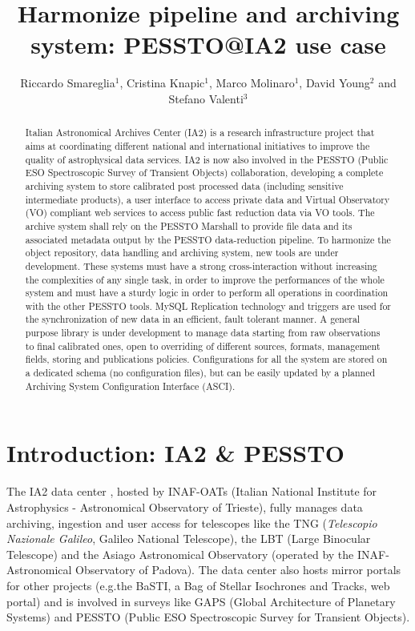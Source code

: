 \documentclass[11pt,twoside]{article}
\begin{document}
\title{Harmonize pipeline and archiving system: PESSTO@IA2 use case}
\author{Riccardo Smareglia$^1$, Cristina Knapic$^1$, Marco Molinaro$^1$, David Young$^2$ and Stefano Valenti$^3$
}

\begin{abstract}
Italian Astronomical Archives Center (IA2) is a research infrastructure project that aims at coordinating different national and international initiatives to improve the quality of astrophysical data services. IA2 is now also involved in the PESSTO (Public ESO Spectroscopic Survey of Transient Objects) collaboration, developing a complete archiving system to store calibrated post processed data (including sensitive intermediate products), a user interface to access private data and Virtual Observatory (VO) compliant web services to access public fast reduction data via VO tools. The archive system shall rely on the PESSTO Marshall to provide file data and its associated metadata output by the PESSTO data-reduction pipeline. To harmonize the object repository, data handling and archiving system, new tools are under development. These systems must have a strong cross-interaction without increasing the complexities of any single task, in order to improve the performances of the whole system and must have a sturdy logic in order to perform all operations in coordination with the other PESSTO tools. MySQL Replication technology and triggers are used for the synchronization of new data in an efficient, fault tolerant manner. A general purpose library is under development to manage data starting from raw observations to final calibrated ones, open to overriding of different sources, formats, management fields, storing and publications policies. Configurations for all the system are stored on a dedicated schema (no configuration files), but can be easily updated by a planned Archiving System Configuration Interface (ASCI). 
\end{abstract}

\section{Introduction: IA2 \& PESSTO}

The IA2 data center \citep{molinaro_spie12}, hosted by INAF-OATs (Italian National Institute for Astrophysics - Astronomical Observatory of Trieste), fully manages data archiving, ingestion and user access for telescopes like the TNG (\textit{Telescopio Nazionale Galileo}, Galileo National Telescope), the LBT (Large Binocular Telescope) and the Asiago Astronomical Observatory (operated by the INAF-Astronomical Observatory of Padova). The data center also hosts mirror portals for other projects (e.g.the BaSTI, a Bag of Stellar Isochrones and Tracks, web portal) and is involved in surveys like GAPS (Global Architecture of Planetary Systems) and PESSTO (Public ESO Spectroscopic Survey for Transient Objects).
\end{document}
